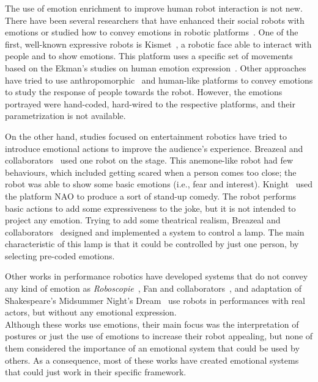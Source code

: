 The use of emotion enrichment to improve human robot interaction is not new. There have been several researchers that have enhanced their social robots with emotions or studied how to convey emotions in robotic platforms~\cite{Li2011,Brown2014}. One of the first, well-known expressive robots is Kismet~\cite{Breazeal2002}, a robotic face able to interact with people and to show emotions. This platform uses a specific set of movements based on the Ekman's studies on human emotion expression~\cite{Ekman2004}. Other approaches have tried to use anthropomorphic~\cite{Arras2012} and human-like platforms to convey emotions to study the response of people towards the robot. However, the emotions portrayed were hand-coded, hard-wired to the respective platforms, and their parametrization is not available.

On the other hand, studies focused on entertainment robotics have tried to introduce emotional actions to improve the audience's experience. Breazeal and collaborators~\cite{Breazeal2003} used one robot on the stage. This anemone-like robot had few behaviours, which included getting scared when a person comes too close; the robot was able to show some basic emotions (i.e., fear and interest). Knight~\cite{Knight2011b,Knight2010} used the platform NAO to produce a sort of stand-up comedy. The robot performs basic actions to add some expressiveness to the joke, but it is not intended to project any emotion. Trying to add some theatrical realism, Breazeal and collaborators~\cite{Breazeal2008} designed and implemented a system to control a lamp. The main characteristic of this lamp is that it could be controlled by just one person, by selecting pre-coded emotions.

Other works in performance robotics have developed systems that do not convey any kind of emotion as \textit{Roboscopie}~\cite{Roboscopie2012,Lemaignan2012}, Fan and collaborators~\cite{Fan2009,Fan2013}, and adaptation of Shakespeare's  Midsummer Night's Dream~\cite{murphy2011} use robots in performances with real actors, but without any emotional expression.\\
Although these works use emotions, their main focus was the interpretation of postures or just the use of emotions to increase their robot appealing, but none of them considered the importance of an emotional system that could be used by others. As a consequence, most of these works have created emotional systems that could just work in their specific framework.
